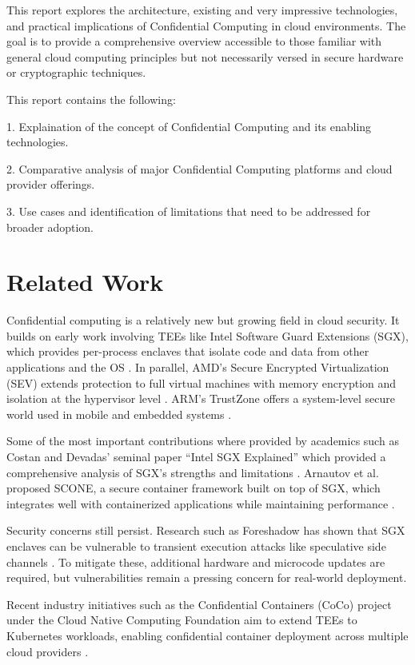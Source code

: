 \documentclass[conference]{IEEEtran}
\begin{document}
This report explores the architecture, existing and very impressive technologies, and practical 
implications of Confidential Computing in cloud environments. The goal is to provide a comprehensive 
overview accessible to those familiar with general cloud computing principles but not necessarily 
versed in secure hardware or cryptographic techniques.

This report contains the following:

1. Explaination of the concept of Confidential Computing and its enabling technologies.

2. Comparative analysis of major Confidential Computing platforms and cloud provider offerings.

3. Use cases and identification of limitations that need to be addressed for broader adoption.

\section{Related Work}
Confidential computing is a relatively new but growing field in cloud security. 
It builds on early work involving TEEs like Intel Software Guard Extensions (SGX), 
which provides per-process enclaves that isolate code and data from other applications and the OS 
\cite{intelSGX}. In parallel, AMD's Secure Encrypted Virtualization (SEV) extends protection to 
full virtual machines with memory encryption and isolation at the hypervisor level \cite{amdSEV}. 
ARM's TrustZone offers a system-level secure world used in mobile and embedded systems 
\cite{armTrustZone}.

Some of the most important contributions where provided by academics such as Costan and Devadas’ 
seminal paper “Intel SGX Explained” which provided a 
comprehensive analysis of SGX's strengths and limitations \cite{costan2016intel}. Arnautov et al. 
proposed SCONE, a secure container framework built on top of SGX, which integrates well with 
containerized applications while maintaining performance \cite{arnautov2016scone}.

Security concerns still persist. Research such as Foreshadow has shown that SGX enclaves can be 
vulnerable to transient execution attacks like speculative side channels \cite{van2018foreshadow}. 
To mitigate these, additional hardware and microcode updates are required, but vulnerabilities 
remain 
a pressing concern for real-world deployment.

Recent industry initiatives such as the Confidential Containers (CoCo) project under the Cloud 
Native Computing Foundation aim to extend TEEs to Kubernetes workloads, enabling confidential 
container deployment across multiple cloud providers \cite{coco}.
\end{document}

